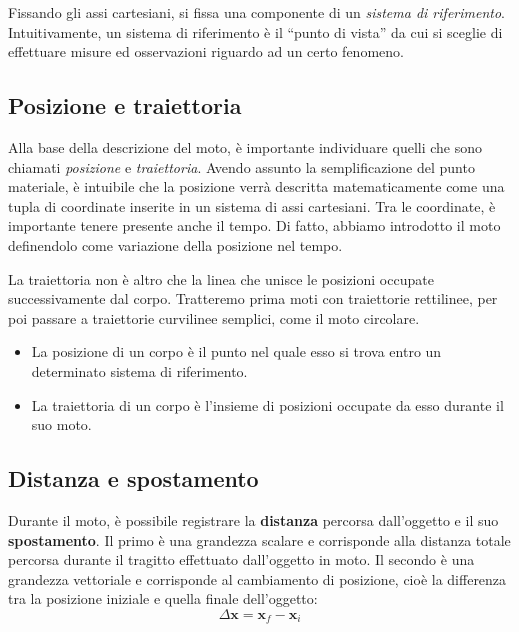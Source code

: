 Fissando gli assi cartesiani, si fissa una componente di un \textit{sistema di
riferimento}. Intuitivamente, un sistema di riferimento è il ``punto di vista''
da cui si sceglie di effettuare misure ed osservazioni riguardo ad un certo
fenomeno.

\subsection{Posizione e traiettoria}
Alla base della descrizione del moto, è importante individuare quelli che sono
chiamati \textit{posizione} e \textit{traiettoria}. Avendo assunto la semplificazione
del punto materiale, è intuibile che la posizione verrà descritta matematicamente
come una tupla di coordinate inserite in un sistema di assi cartesiani. Tra le
coordinate, è importante tenere presente anche il tempo. Di fatto, abbiamo
introdotto il moto definendolo come variazione della posizione nel tempo.

La traiettoria non è altro che la linea che unisce le posizioni occupate
successivamente dal corpo. Tratteremo prima moti con traiettorie rettilinee,
per poi passare a traiettorie curvilinee semplici, come il moto circolare.

\vspace{8pt}
\begin{tcolorbox}[colback = yellow!30, colframe = yellow!30!black, title = {Posizione e traiettoria}]
\begin{itemize}
    \item La posizione di un corpo è il punto nel quale esso si trova entro un
    determinato sistema di riferimento.

    \item La traiettoria di un corpo è l'insieme di posizioni occupate da esso
    durante il suo moto.
\end{itemize}
\end{tcolorbox}
\vspace{5pt}

\subsection{Distanza e spostamento}
Durante il moto, è possibile registrare la \textbf{distanza} percorsa
dall'oggetto e il suo \textbf{spostamento}. Il primo è una grandezza
scalare e corrisponde alla distanza totale percorsa durante il tragitto
effettuato dall'oggetto in moto. Il secondo è una grandezza vettoriale e
corrisponde al cambiamento di posizione,
cioè la differenza tra la posizione iniziale e quella finale dell'oggetto:
\[ \Delta \mathbf{x} = \mathbf{x}_f - \mathbf{x}_i \]


